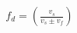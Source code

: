 \documentclass[preview]{standalone}
\begin{document}
\begin{align*}
f_d =\left(\frac{v_s}{v_s \pm  v_f}\right)
\end{align*}
\end{document}
